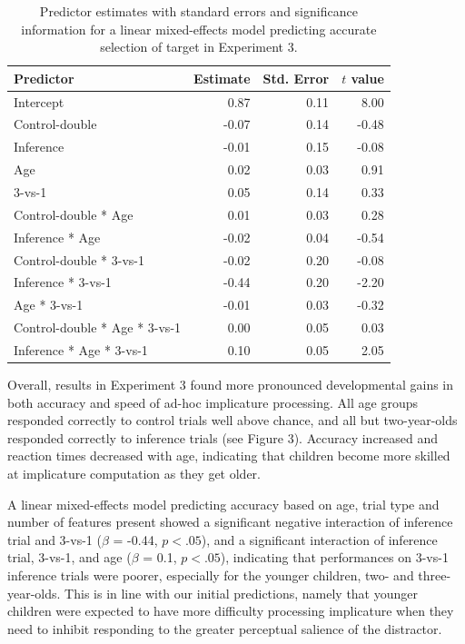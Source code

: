 \documentclass[a4paper,man,apacite,floatsintext]{apa6}
\begin{document}
\begin{table}[tb]
\centering
\begin{tabular}{lrrr}
 Predictor & Estimate & Std. Error & $t$ value \\ 
  \hline
Intercept & 0.87 & 0.11 & 8.00 \\ 
  Control-double & -0.07 & 0.14 & -0.48 \\ 
  Inference & -0.01 & 0.15 & -0.08 \\ 
  Age & 0.02 & 0.03 & 0.91 \\ 
  3-vs-1 & 0.05 & 0.14 & 0.33 \\ 
  Control-double * Age & 0.01 & 0.03 & 0.28 \\ 
  Inference * Age & -0.02 & 0.04 & -0.54 \\ 
  Control-double * 3-vs-1 & -0.02 & 0.20 & -0.08 \\ 
  Inference * 3-vs-1 & -0.44 & 0.20 & -2.20 \\ 
  Age * 3-vs-1 & -0.01 & 0.03 & -0.32 \\ 
  Control-double * Age * 3-vs-1 & 0.00 & 0.05 & 0.03 \\ 
  Inference * Age * 3-vs-1 & 0.10 & 0.05 & 2.05 \\ 
   \hline
\end{tabular}
\caption{Predictor estimates with standard errors and significance information for a linear mixed-effects model predicting accurate selection of target in Experiment 3.} 
\label{tab:exp3_tab}
\end{table}

Overall, results in Experiment 3 found more pronounced developmental
gains in both accuracy and speed of ad-hoc implicature processing. All
age groups responded correctly to control trials well above chance, and
all but two-year-olds responded correctly to inference trials (see
Figure 3). Accuracy increased and reaction times decreased with age,
indicating that children become more skilled at implicature computation
as they get older.

A linear mixed-effects model predicting accuracy based on age, trial
type and number of features present showed a significant negative
interaction of inference trial and 3-vs-1 (\(\beta\) = -0.44,
\(p <.05\)), and a significant interaction of inference trial, 3-vs-1,
and age (\(\beta\) = 0.1, \(p <.05\)), indicating that performances on
3-vs-1 inference trials were poorer, especially for the younger
children, two- and three-year-olds. This is in line with our initial
predictions, namely that younger children were expected to have more
difficulty processing implicature when they need to inhibit responding
to the greater perceptual salience of the distractor.
\end{document}
